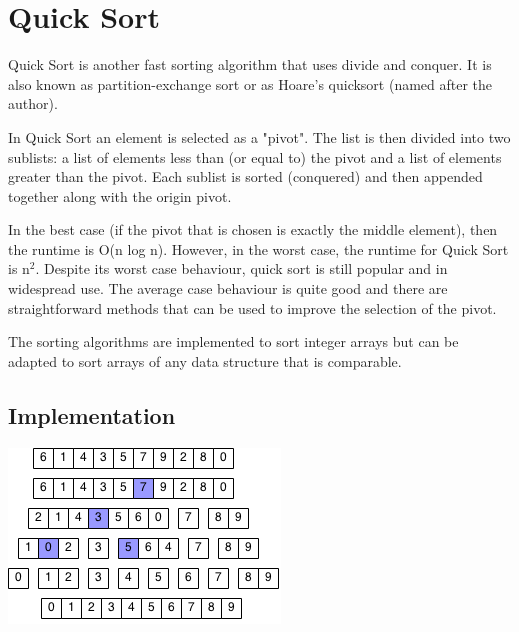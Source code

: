 \documentclass[11pt,oneside]{book}
\makeatletter
\def\maxwidth#1{\ifdim\Gin@nat@width>#1 #1\else\Gin@nat@width\fi}
\makeatother
\begin{document}
\section{Quick Sort}

Quick Sort is another fast sorting algorithm that uses divide and conquer. It is also known as partition-exchange sort or as Hoare's quicksort (named after the author).

In Quick Sort an element is selected as a "pivot". The list is then divided into two sublists: a list of elements less than (or equal to) the pivot and a list of elements greater than the pivot. Each sublist is sorted (conquered) and then appended together along with the origin pivot.

In the best case (if the pivot that is chosen is exactly the middle element), then the runtime is O(n log n). However, in the worst case, the runtime for Quick Sort is n$^{2}$. Despite its worst case behaviour, quick sort is still popular and in widespread use. The average case behaviour is quite good and there are straightforward methods that can be used to improve the selection of the pivot.

The sorting algorithms are implemented to sort integer arrays but can be adapted to sort arrays of any data structure that is comparable.

\subsection{Implementation}

\includegraphics[width=\maxwidth{\textwidth}]{quicksort.png}
\end{document}

